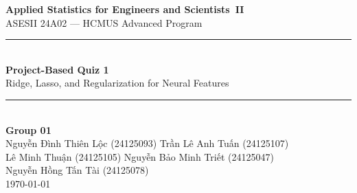 \documentclass[11pt,a4paper]{article}
\begin{document}
\thispagestyle{empty}
\begin{center}
    \vspace*{1.5cm}
    {\LARGE\bfseries Applied Statistics for Engineers and Scientists~II}\\[8pt]
    {\Large ASESII 24A02 --- HCMUS Advanced Program}\\[24pt]
    \rule{0.8\textwidth}{0.4pt}\\[18pt]
    {\huge\bfseries Project-Based Quiz 1}\\[10pt]
    {\Large Ridge, Lasso, and Regularization for Neural Features}\\[18pt]
    \rule{0.8\textwidth}{0.4pt}\\[30pt]
    {\large\textbf{Group 01}}\\[10pt]
    {\large
    Nguyễn Đình Thiên Lộc (24125093) \quad
    Trần Lê Anh Tuấn (24125107) \\[4pt]
    Lê Minh Thuận (24125105) \quad
    Nguyễn Bảo Minh Triết (24125047) \\[4pt]
    Nguyễn Hồng Tấn Tài (24125078)
    }\\[30pt]
    {\large \today}
    \vfill
\end{center}
\newpage

\thispagestyle{plain}
\tableofcontents
\newpage





\newpage


\newpage
\appendix

\end{document}

